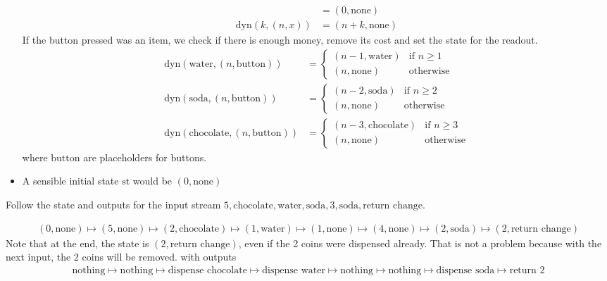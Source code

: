 \begin{itemize}
\begin{align*}
      &= (0,\text{none})
      \\
      \text{dyn}(k,(n,x)) 
      &= (n+k,\text{none})
    \end{align*}
    If the button pressed was an item, we check if there is enough money, remove its cost and set the state for the readout.
    \begin{align*}
      \text{dyn}(\text{water},(n,\text{button})) 
      &= 
      \left\{\begin{array}{ll}
          (n-1,\text{water}) & \text{if } n \geq 1\\
          (n,\text{none}) & \text{otherwise}
      \end{array} \right.
      \\
      \text{dyn}(\text{soda},(n,\text{button})) 
      &= 
      \left\{\begin{array}{ll}
          (n-2,\text{soda}) & \text{if } n \geq 2\\
          (n,\text{none}) & \text{otherwise}
      \end{array} \right.
      \\
      \text{dyn}(\text{chocolate},(n,\text{button})) 
      &= 
      \left\{\begin{array}{ll}
          (n-3,\text{chocolate}) & \text{if } n \geq 3\\
          (n,\text{none}) & \text{otherwise}
      \end{array} \right.
    \end{align*}
    where $\text{button}$ are placeholders for buttons.
  \item A sensible initial state $\text{st}$ would be $(0,\text{none})$
\end{itemize}
Follow the state and outputs for the input stream $5,\text{chocolate},\text{water},\text{soda},3,\text{soda},\text{return change}$.

\begin{align*}
  (0,\text{none})
  \mapsto 
  (5,\text{none})
  \mapsto 
  (2,\text{chocolate})
  \mapsto 
  (1,\text{water})
  \mapsto 
  (1,\text{none})
  \mapsto 
  (4,\text{none})
  \mapsto 
  (2,\text{soda})
  \mapsto 
  (2, \text{return change})
\end{align*}
Note that at the end, the state is $(2, \text{return change})$, even if the 2 coins were dispensed already. That is not a problem because with the next input, the $2$ coins will be removed.
with outputs
\begin{align*}
  \text{nothing}
  \mapsto 
  \text{nothing}
  \mapsto 
  \text{dispense chocolate}
  \mapsto 
  \text{dispense water}
  \mapsto 
  \text{nothing}
  \mapsto 
  \text{nothing}
  \mapsto 
  \text{dispense soda}
  \mapsto 
  \text{return 2}
\end{align*}

